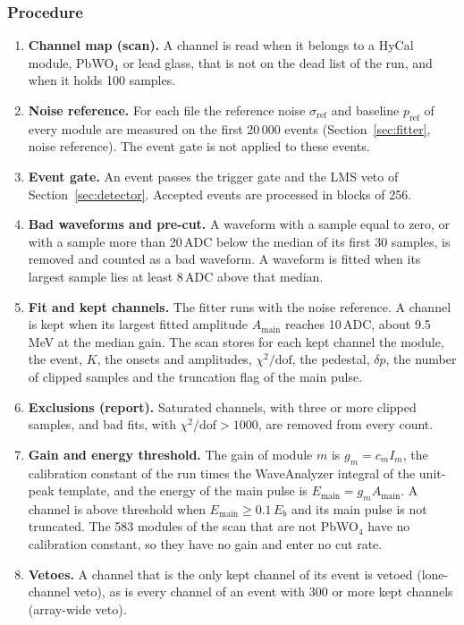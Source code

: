 \documentclass[11pt]{article}
\begin{document}
\subsubsection{Procedure}

\begin{enumerate}
\item \textbf{Channel map (scan).} A channel is read when it belongs to a HyCal module, PbWO$_4$ or lead glass, that is not on the dead list of the run, and when it holds 100 samples.
\item \textbf{Noise reference.} For each file the reference noise $\sigma_{\mathrm{ref}}$ and baseline $p_{\mathrm{ref}}$ of every module are measured on the first 20\,000 events (Section~\ref{sec:fitter}, noise reference). The event gate is not applied to these events.
\item \textbf{Event gate.} An event passes the trigger gate and the LMS veto of Section~\ref{sec:detector}. Accepted events are processed in blocks of 256.
\item \textbf{Bad waveforms and pre-cut.} A waveform with a sample equal to zero, or with a sample more than 20\,ADC below the median of its first 30 samples, is removed and counted as a bad waveform. A waveform is fitted when its largest sample lies at least 8\,ADC above that median.
\item \textbf{Fit and kept channels.} The fitter runs with the noise reference. A channel is kept when its largest fitted amplitude $A_{\mathrm{main}}$ reaches 10\,ADC, about 9.5\,MeV at the median gain. The scan stores for each kept channel the module, the event, $K$, the onsets and amplitudes, $\chi^2/\mathrm{dof}$, the pedestal, $\delta p$, the number of clipped samples and the truncation flag of the main pulse.
\item \textbf{Exclusions (report).} Saturated channels, with three or more clipped samples, and bad fits, with $\chi^2/\mathrm{dof} > 1000$, are removed from every count.
\item \textbf{Gain and energy threshold.} The gain of module $m$ is $g_m = c_m I_m$, the calibration constant of the run times the WaveAnalyzer integral of the unit-peak template, and the energy of the main pulse is $E_{\mathrm{main}} = g_m A_{\mathrm{main}}$. A channel is above threshold when $E_{\mathrm{main}} \ge 0.1\,E_b$ and its main pulse is not truncated. The 583 modules of the scan that are not PbWO$_4$ have no calibration constant, so they have no gain and enter no cut rate.
\item \textbf{Vetoes.} A channel that is the only kept channel of its event is vetoed (lone-channel veto), as is every channel of an event with 300 or more kept channels (array-wide veto).

\end{enumerate}
\end{document}
